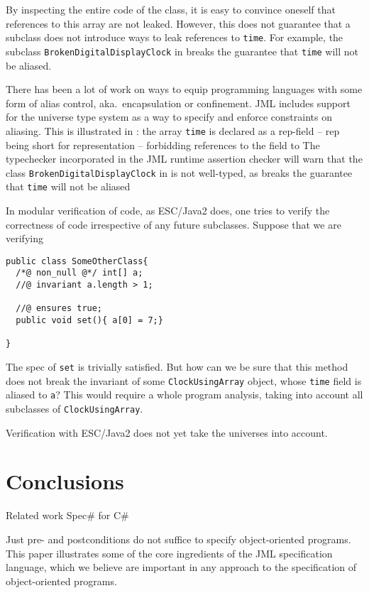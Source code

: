 \documentclass{llncs}
\begin{document}
By inspecting the entire code of the class, it is easy to convince
oneself that references to this array are not leaked.
However, this does not guarantee that a subclass does not introduce
ways to leak references to \texttt{time}.
For example, the subclass \texttt{BrokenDigitalDisplayClock} in 
 breaks the guarantee that \texttt{time}
will not be aliased.

There has been a lot of work on ways to equip programming languages
with some form of alias control, aka.\ encapsulation or confinement.
JML includes support for the universe type system
\cite{Mueller-Poetzsch-Heffter-Leavens03} as a way to specify
and enforce constraints on aliasing. This is illustrated in 
: the array \texttt{time} is declared
as a rep-field -- rep being short for representation -- forbidding
references to the field to 
The typechecker incorporated in the JML runtime assertion checker
will warn that the class \texttt{BrokenDigitalDisplayClock}
in  is not well-typed, as breaks
the guarantee that \texttt{time} will not be aliased

In modular verification of code, as ESC/Java2 does, one tries to
verify the correctness of code irrespective of any future
subclasses.
Suppose that we are verifying
\begin{verbatim}
public class SomeOtherClass{
  /*@ non_null @*/ int[] a;
  //@ invariant a.length > 1;
 
  //@ ensures true;
  public void set(){ a[0] = 7;}

}
\end{verbatim}
The spec of \texttt{set} is trivially satisfied.
But how can we be sure that this method does not break the invariant
of some \texttt{ClockUsingArray} object, whose \texttt{time} field
is aliased to \texttt{a}? This would require a whole program analysis,
taking into account all subclasses of \texttt{ClockUsingArray}.

Verification with ESC/Java2 does not yet take the universes into account.

\section{Conclusions}

Related work Spec\# for C\# \cite{SpecSharp}

Just pre- and postconditions do not suffice to specify object-oriented 
programs.
This paper illustrates some of the core ingredients of the JML
specification language, which we believe are important in any approach
to the specification of object-oriented programs.
\end{document}
